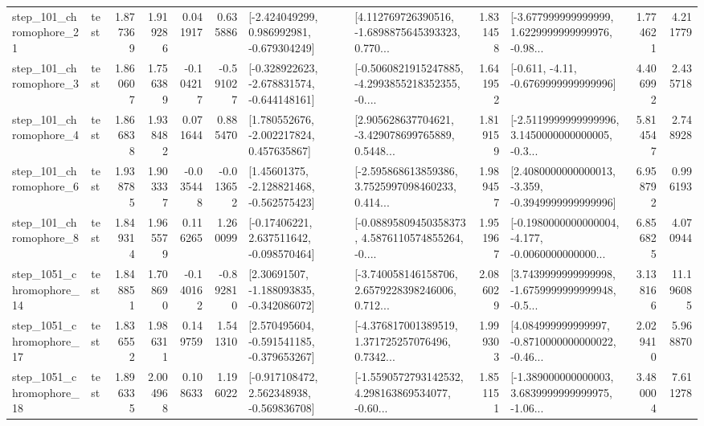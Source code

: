 \begin{tabular}{llrrrrllrlrr}
  step\_101\_chromophore\_21 &      test &      1.877369 &    1.919286 &      0.041917 &  0.635886 &   [-2.424049299, 0.986992981, -0.679304249] &  [4.112769726390516, -1.6898875645393323, 0.770... &       1.831458 &  [-3.677999999999999, 1.6229999999999976, -0.98... &            1.774621 &          4.211779 \\
   step\_101\_chromophore\_3 &      test &      1.860607 &    1.756389 &     -0.104217 & -0.591027 &  [-0.328922623, -2.678831574, -0.644148161] &  [-0.5060821915247885, -4.2993855218352355, -0.... &       1.641952 &               [-0.611, -4.11, -0.6769999999999996] &            4.406992 &          2.435718 \\
   step\_101\_chromophore\_4 &      test &      1.866838 &    1.938482 &      0.071644 &  0.885470 &    [1.780552676, -2.002217824, 0.457635867] &  [2.905628637704621, -3.429078699765889, 0.5448... &       1.819159 &  [-2.5119999999999996, 3.1450000000000005, -0.3... &            5.814547 &          2.748928 \\
   step\_101\_chromophore\_6 &      test &      1.938785 &    1.903337 &     -0.035448 & -0.013652 &    [1.45601375, -2.128821468, -0.562575423] &  [-2.595868613859386, 3.7525997098460233, 0.414... &       1.989457 &  [2.4080000000000013, -3.359, -0.3949999999999996] &            6.958792 &          0.996193 \\
   step\_101\_chromophore\_8 &      test &      1.849314 &    1.965579 &      0.116265 &  1.260099 &    [-0.17406221, 2.637511642, -0.098570464] &  [-0.08895809450358373, 4.5876110574855264, -0.... &       1.951967 &  [-0.1980000000000004, -4.177, -0.0060000000000... &            6.856825 &          4.070944 \\
 step\_1051\_chromophore\_14 &      test &      1.848851 &    1.708690 &     -0.140162 & -0.892810 &    [2.30691507, -1.188093835, -0.342086072] &  [-3.740058146158706, 2.6579228398246006, 0.712... &       2.086029 &  [3.7439999999999998, -1.6759999999999948, -0.5... &            3.138166 &         11.196085 \\
 step\_1051\_chromophore\_17 &      test &      1.836552 &    1.986311 &      0.149759 &  1.541310 &   [2.570495604, -0.591541185, -0.379653267] &  [-4.376817001389519, 1.371725257076496, 0.7342... &       1.999303 &  [4.084999999999997, -0.8710000000000022, -0.46... &            2.029410 &          5.968870 \\
 step\_1051\_chromophore\_18 &      test &      1.896335 &    2.004968 &      0.108633 &  1.196022 &   [-0.917108472, 2.562348938, -0.569836708] &  [-1.5590572793142532, 4.298163869534077, -0.60... &       1.851151 &  [-1.389000000000003, 3.6839999999999975, -1.06... &            3.480004 &          7.611278 \\

\end{tabular}
